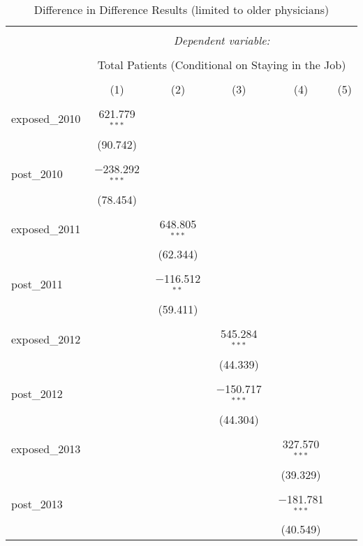
\begin{table}[!htbp] \centering 
  \caption{Difference in Difference Results (limited to older physicians)} 
  \label{} 
\begin{tabular}{@{\extracolsep{5pt}}lccccc} 
\\[-1.8ex]\hline 
\hline \\[-1.8ex] 
 & \multicolumn{5}{c}{\textit{Dependent variable:}} \\ 
\cline{2-6} 
\\[-1.8ex] & \multicolumn{5}{c}{Total Patients (Conditional on Staying in the Job)} \\ 
\\[-1.8ex] & (1) & (2) & (3) & (4) & (5)\\ 
\hline \\[-1.8ex] 
 exposed\_2010 & 621.779$^{***}$ &  &  &  &  \\ 
  & (90.742) &  &  &  &  \\ 
  & & & & & \\ 
 post\_2010 & $-$238.292$^{***}$ &  &  &  &  \\ 
  & (78.454) &  &  &  &  \\ 
  & & & & & \\ 
 exposed\_2011 &  & 648.805$^{***}$ &  &  &  \\ 
  &  & (62.344) &  &  &  \\ 
  & & & & & \\ 
 post\_2011 &  & $-$116.512$^{**}$ &  &  &  \\ 
  &  & (59.411) &  &  &  \\ 
  & & & & & \\ 
 exposed\_2012 &  &  & 545.284$^{***}$ &  &  \\ 
  &  &  & (44.339) &  &  \\ 
  & & & & & \\ 
 post\_2012 &  &  & $-$150.717$^{***}$ &  &  \\ 
  &  &  & (44.304) &  &  \\ 
  & & & & & \\ 
 exposed\_2013 &  &  &  & 327.570$^{***}$ &  \\ 
  &  &  &  & (39.329) &  \\ 
  & & & & & \\ 
 post\_2013 &  &  &  & $-$181.781$^{***}$ &  \\ 
  &  &  &  & (40.549) &  \\ 

\end{tabular}
\end{table}
